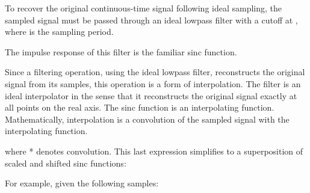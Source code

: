 \documentclass{article}
\begin{document}
\begin{CellGroup}


To recover the original continuous-time signal following ideal sampling, the sampled signal must be passed through an ideal lowpass filter with a
cutoff at , where  is the sampling period.






The impulse response of this filter is the familiar sinc function.

Since a filtering operation, using the ideal lowpass filter, reconstructs the original signal from its samples, this operation is a form of interpolation.
The filter is an ideal interpolator in the sense that it reconstructs the original signal exactly at all points on the real axis. The sinc function
is an interpolating function. Mathematically, interpolation is a convolution of the sampled signal with the interpolating function.




where * denotes convolution. This last expression simplifies to a superposition of scaled and shifted sinc functions:




For example, given the following samples:





\end{CellGroup}
\end{document}
